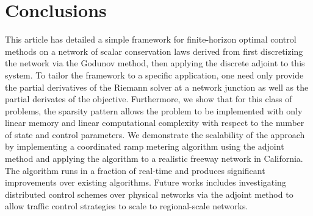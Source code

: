 \section{Conclusions\label{sec:Conclusions}}

This article has detailed a simple framework for finite-horizon optimal control methods on a network of scalar conservation laws derived from first discretizing the network via the Godunov method, then applying the discrete adjoint to this system. To tailor the framework to a specific application, one need only provide the partial derivatives of the Riemann solver at a network junction as well as the partial derivates of the objective. Furthermore, we show that for this class of problems, the sparsity pattern allows the problem to be implemented with only linear memory and linear computational complexity with respect to the number of state and control parameters. We demonstrate the scalability of the approach by implementing a coordinated ramp metering algorithm using the adjoint method and applying the algorithm to a realistic freeway network in California. The algorithm runs in a fraction of real-time and produces significant improvements over existing algorithms. Future works includes investigating distributed control schemes over physical networks via the adjoint method to allow traffic control strategies to scale to regional-scale networks.
